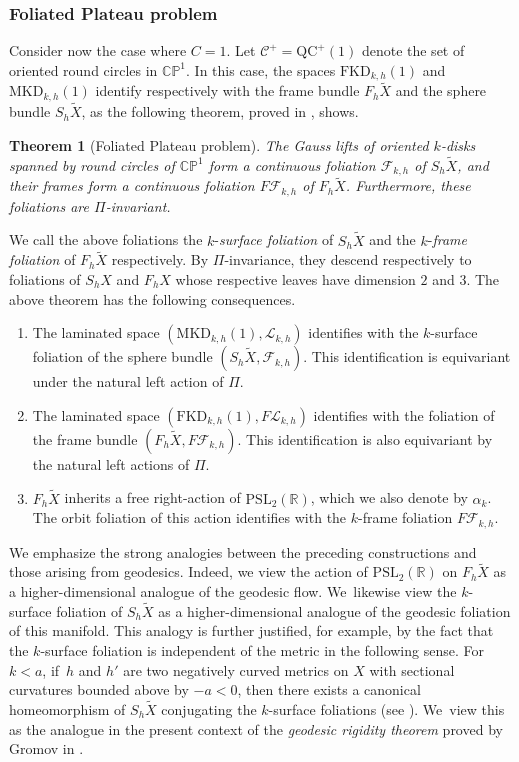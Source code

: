 \documentclass[11pt]{article}
\newcommand{\ksurface}{$k$\nobreakdash-surface\xspace}
\newcommand{\kdisks}{$k$\nobreakdash-disks\xspace}
\theoremstyle{plain}
\newtheorem{theorem}{Theorem}[section]
\theoremstyle{definition}
\newcommand\PSL{\mathrm{PSL}_2(\mathbb{R})}
\newcommand\CP{\C\PP^1}
\newcommand{\C}{{\mathbb C}}
\newcommand{\PP}{{\mathbb P}}
\newcommand{\cC}{{\mathcal C}}
\newcommand{\cF}{{\mathcal F}}
\newcommand{\cL}{{\mathcal L}}
\newcommand{\QC}{\mathrm{QC}}
\newcommand{\MKD}{\mathrm{MKD}}
\newcommand{\FKD}{\mathrm{FKD}}
\begin{document}
\subsubsection{Foliated Plateau problem}\label{sss.FPP} Consider now the case where $C=1$. Let $\cC^+=\QC^+(1)$ denote the set of oriented round circles in $\CP$. In this case, the spaces $\FKD_{k,h}(1)$ and $\MKD_{k,h}(1)$ identify respectively with the frame bundle $F_h\tilde{X}$ and the sphere bundle $S_h\tilde{X}$, as the following theorem, proved in \cite[Th.\,2.1.3]{ALS}, shows.

\begin{theorem}[Foliated Plateau problem]\label{th_foliated_Plateau} The Gauss lifts of oriented \kdisks spanned by round circles of $\CP$ form a continuous foliation $\cF_{k,h}$ of $S_h\tilde{X}$, and their frames form a continuous foliation $F\cF_{k,h}$ of $F_h\tilde{X}$. Furthermore, these foliations are $\Pi$-invariant.
\end{theorem}

We call the above foliations the $k$-\emph{surface foliation} of $S_h\tilde{X}$ and the $k$-\emph{frame foliation} of $F_h\tilde{X}$ respectively. By $\Pi$-invariance, they descend respectively to foliations of $S_h X$ and $F_h X$ whose respective leaves have dimension $2$ and $3$. The above theorem has the following consequences.

\begin{enumerate}
\item The laminated space $(\MKD_{k,h}(1),\cL_{k,h})$ identifies with the \ksurface foliation of the sphere bundle $(S_h\tilde{X},\cF_{k,h})$. This identification is equivariant under the natural left action of $\Pi$.
\item The laminated space $(\FKD_{k,h}(1),F\cL_{k,h})$ identifies with the foliation of the frame bundle $(F_h\tilde{X},F\cF_{k,h})$. This identification is also equivariant by the natural left actions of $\Pi$.
\item $F_h\tilde{X}$ inherits a free right-action of $\PSL$, which we also denote by $\alpha_k$. The orbit foliation of this action identifies with the $k$-frame foliation $F\cF_{k,h}$.
\end{enumerate}

We emphasize the strong analogies between the preceding constructions and those arising from geodesics. Indeed, we view the action of $\PSL$ on $F_h\tilde X$ as a higher-dimensional analogue of the geodesic flow. We~likewise view the \ksurface foliation of $S_h\tilde{X}$ as a higher-dimensional analogue of the geodesic foliation of this manifold. This analogy is further justified, for example, by the fact that the \ksurface foliation is independent of the metric in the following sense. For $k<a$, if~$h$ and $h'$ are two negatively curved metrics on $X$ with sectional curvatures bounded above by \hbox{$-a<0$}, then there exists a canonical homeomorphism of $S_h\tilde{X}$ conjugating the \ksurface foliations (see \cite[Th.\,2.1.5.]{ALS}). We~view this as the analogue in the present context of the \emph{geodesic rigidity theorem} proved by Gromov in \cite{Gromov3}.
\end{document}
